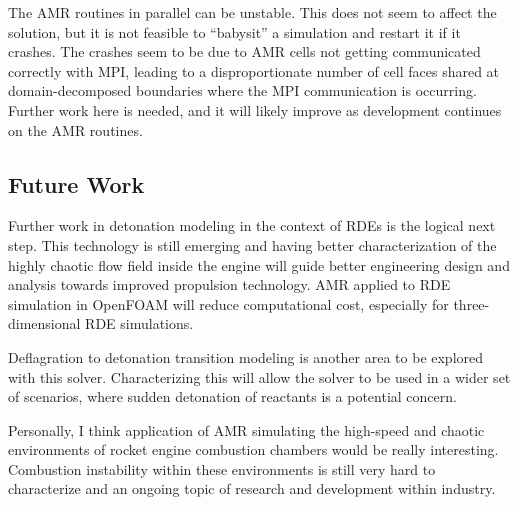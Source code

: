 The AMR routines in parallel can be unstable. This does not seem to affect the solution, but it is not feasible to ``babysit'' a simulation and restart it if it crashes. The crashes seem to be due to AMR cells not getting communicated correctly with MPI, leading to a disproportionate number of cell faces shared at domain-decomposed boundaries where the MPI communication is occurring. Further work here is needed, and it will likely improve as development continues on the AMR routines. 


\subsection{Future Work}
Further work in detonation modeling in the context of RDEs is the logical next step. This technology is still emerging and having better characterization of the highly chaotic flow field inside the engine will guide better engineering design and analysis towards improved propulsion technology. AMR applied to RDE simulation in OpenFOAM will reduce computational cost, especially for three-dimensional RDE simulations. 

Deflagration to detonation transition modeling is another area to be explored with this solver. Characterizing this will allow the solver to be used in a wider set of scenarios, where sudden detonation of reactants is a potential concern. 

Personally, I think application of AMR simulating the high-speed and chaotic environments of rocket engine combustion chambers would be really interesting. Combustion instability within these environments is still very hard to characterize and an ongoing topic of research and development within industry. 


